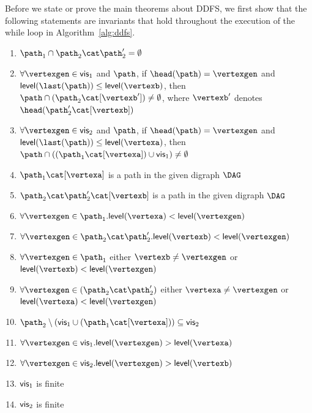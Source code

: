 Before we state or prove the main theorems about DDFS, we first show that the following statements are invariants that hold throughout the execution of the while loop in Algorithm~\ref{alg:ddfs}.
\begin{enumerate}
\item {\label{invar:1} $\patha \cap \pathb\cat\pathb' = \emptyset$}
\item {\label{invar:2} $\forall\vertexgen\in\visa$ and $\path$, if $\head(\path) = \vertexgen$ and $\level(\last(\path)) \leq \level(\vertexb)$, then $\path\cap(\pathb\cat[\vertexb']) \neq \emptyset$, where $\vertexb'$ denotes $\head(\pathb'\cat[\vertexb])$}
\item {\label{invar:3} $\forall\vertexgen\in\visb$ and $\path$, if $\head(\path) = \vertexgen$ and $\level(\last(\path)) \leq \level(\vertexa)$, then $\path\cap((\patha\cat[\vertexa]) \cup \visa)\neq \emptyset$}
\item {\label{invar:4} $\patha\cat[\vertexa]$ is a path in the given digraph $\DAG$}
\item {\label{invar:5} $\pathb\cat\pathb'\cat[\vertexb]$ is a path in the given digraph $\DAG$}
\item {\label{invar:6} $\forall\vertexgen\in\patha. \level(\vertexa) < \level(\vertexgen)$}
\item {\label{invar:7} $\forall\vertexgen\in\pathb\cat\pathb'. \level(\vertexb) < \level(\vertexgen)$}
\item {\label{invar:6'} $\forall\vertexgen\in\patha$ either $\vertexb\neq\vertexgen$ or $\level(\vertexb) < \level(\vertexgen)$}
\item {\label{invar:7'} $\forall\vertexgen\in(\pathb\cat\pathb')$ either $\vertexa\neq\vertexgen$ or $\level(\vertexa) < \level(\vertexgen)$}
\item {\label{invar:8} $\pathb\setminus(\visa\cup(\patha\cat[\vertexa]))\subseteq\visb$}
\item {\label{invar:10} $\forall\vertexgen\in\visa.\level(\vertexgen)>\level(\vertexa)$}
\item {\label{invar:11} $\forall\vertexgen\in\visb.\level(\vertexgen)>\level(\vertexb)$}
\item {\label{invar:12} $\textsf{\upshape vis}_1$ is finite}
\item {\label{invar:13} $\textsf{\upshape vis}_2$ is finite}
\end{enumerate}

